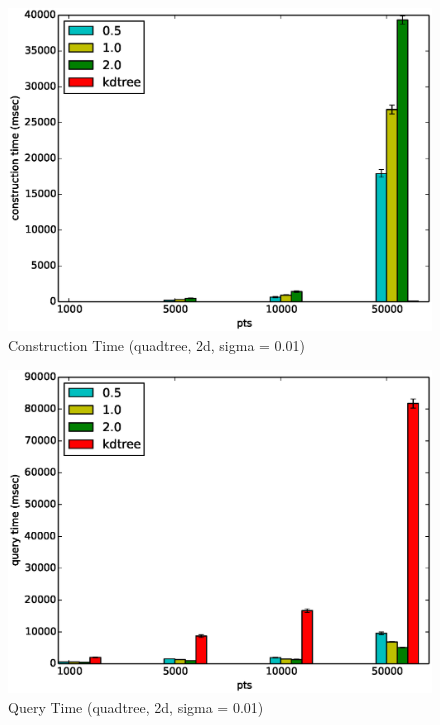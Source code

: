 \documentclass[mcs]{scsthesis}
\begin{document}
\begin{figure}
\begin{center}
\includegraphics[scale=0.5]{diagrams/2d_group_bypts_sigma0.01_ctime_qt.eps}
\caption{Construction Time (quadtree, 2d, sigma = 0.01)}
\label{fig:point_set_size_ctime_qt}
\end{center}
\end{figure}

\begin{figure}
\begin{center}
\includegraphics[scale=0.5]{diagrams/2d_group_bypts_sigma0.01_qtime_qt.eps}
\caption{Query Time (quadtree, 2d, sigma = 0.01)}
\label{fig:point_set_size_qtime_qt}
\end{center}
\end{figure}
\end{document}
